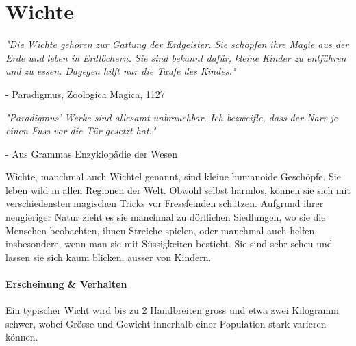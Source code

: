 \documentclass[10pt,twoside,twocolumn,openany]{book}
\begin{document}





\section{Wichte}
\begin{quotebox}
	\textit{"Die Wichte gehören zur Gattung der Erdgeister. Sie schöpfen ihre Magie aus der Erde und leben in Erdlöchern. Sie sind bekannt dafür, kleine Kinder zu entführen und zu essen. Dagegen hilft nur die Taufe des Kindes."}
	\begin{flushright}
		- Paradigmus, Zoologica Magica, 1127
	\end{flushright}
	
	\noindent\emph{"Paradigmus' Werke sind allesamt unbrauchbar. Ich bezweifle, dass der Narr je einen Fuss vor die Tür gesetzt hat."}
	\begin{flushright}
		- Aus Grammas Enzyklopädie der Wesen
	\end{flushright}
\end{quotebox}

Wichte, manchmal auch Wichtel genannt, sind kleine humanoide Geschöpfe. Sie leben wild in allen Regionen der Welt. Obwohl selbst harmlos, können sie sich mit verschiedensten magischen Tricks vor Fressfeinden schützen. Aufgrund ihrer neugieriger Natur zieht es sie manchmal zu dörflichen Siedlungen, wo sie die Menschen beobachten, ihnen Streiche spielen, oder manchmal auch helfen, insbesondere, wenn man sie mit Süssigkeiten besticht. Sie sind sehr scheu und lassen sie sich kaum blicken, ausser von Kindern.

\paragraph{Erscheinung \& Verhalten}
Ein typischer Wicht wird bis zu 2 Handbreiten gross und etwa zwei Kilogramm schwer, wobei Grösse und Gewicht innerhalb einer Population stark varieren können.
\end{document}
